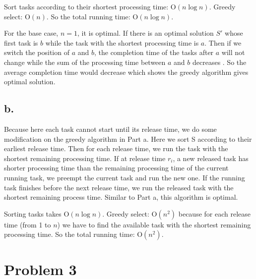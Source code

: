 \documentclass[twoside,11pt]{homework}
\begin{document}
Sort tasks according to their shortest processing time: O$(n \log n)$.
Greedy select: O$(n)$.
So the total running time: O$(n \log n)$.

For the base case, $n=1$, it is optimal.
If there is an optimal solution $S'$ whose first task is $b$ while the task with the shortest processing time is $a$.
Then if we switch the position of $a$ and $b$, the completion time of the tasks after $a$ will not change while the sum of the processing time between $a$ and $b$ decreases .
So the average completion time would decrease which shows the greedy algorithm gives optimal solution.

\subsection*{b.}
Because here each task cannot start until its release time, we do some modification on the greedy algorithm in Part a.
Here we sort S according to their earliest release time.
Then for each release time, we run the task with the shortest remaining processing time.
If at release time $r_i$, a new released task has shorter processing time than the remaining processing time of the current running task, we preempt the current task and run the new one.
If the running task finishes before the next release time, we run the released task with the shortest remaining process time.
Similar to Part a, this algorithm is optimal.

Sorting tasks takes O$(n \log n)$.
Greedy select: O$(n^2)$ because for each release time (from 1 to $n$) we have to find the available task with the shortest remaining processing time.
So the total running time: O$(n^2)$.


\section*{Problem 3}
\end{document}

